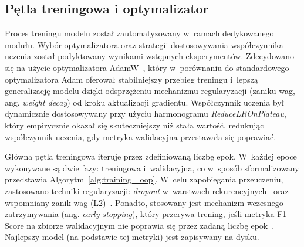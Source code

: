 \subsection{Pętla treningowa i optymalizator}
\label{ssec:petla_treningowa}

Proces treningu modelu został zautomatyzowany w~ramach dedykowanego modułu. Wybór optymalizatora oraz strategii dostosowywania współczynnika uczenia został podyktowany wynikami wstępnych eksperymentów. Zdecydowano się na użycie optymalizatora AdamW~\autocite{Loshchilov2019AdamW}, który w~porównaniu do standardowego optymalizatora Adam oferował stabilniejszy przebieg treningu i~lepszą generalizację modelu dzięki odsprzężeniu mechanizmu regularyzacji (zaniku wag, ang. \textit{weight decay}) od kroku aktualizacji gradientu. Współczynnik uczenia był dynamicznie dostosowywany przy użyciu harmonogramu \textit{ReduceLROnPlateau}, który empirycznie okazał się skuteczniejszy niż stała wartość, redukując współczynnik uczenia, gdy metryka walidacyjna przestawała się poprawiać.

Główna pętla treningowa iteruje przez zdefiniowaną liczbę epok. W~każdej epoce wykonywane są dwie fazy: treningowa i~walidacyjna, co w~sposób sformalizowany przedstawia Algorytm~\ref{alg:training_loop}. W~celu zapobiegania przeuczeniu, zastosowano techniki regularyzacji: \textit{dropout} w~warstwach rekurencyjnych~\autocite{Chung2014GRU, KlapuriDavy2006SignalProcessing} oraz wspomniany zanik wag (L2)~\autocite{Loshchilov2019AdamW, KlapuriDavy2006SignalProcessing}. Ponadto, stosowany jest mechanizm wczesnego zatrzymywania (ang. \textit{early stopping}), który przerywa trening, jeśli metryka F1-Score na zbiorze walidacyjnym nie poprawia się przez zadaną liczbę epok~\autocite{Benetos2019AutomaticMusicTranscription}. Najlepszy model (na podstawie tej metryki) jest zapisywany na dysku.

